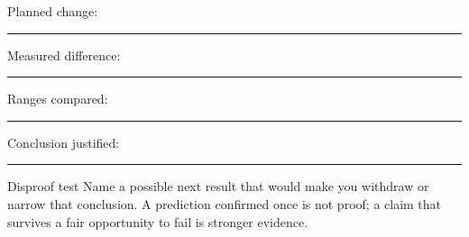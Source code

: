 \noindent Planned change: \rule{42mm}{.4pt}\quad
Measured difference: \rule{48mm}{.4pt}

\noindent Ranges compared: \rule{38mm}{.4pt}\quad
Conclusion justified: \rule{65mm}{.4pt}

\begin{telospanel}{Disproof test}
Name a possible next result that would make you withdraw or narrow that
conclusion. A prediction confirmed once is not proof; a claim that survives a
fair opportunity to fail is stronger evidence.
\end{telospanel}
\lowvoltagenote

